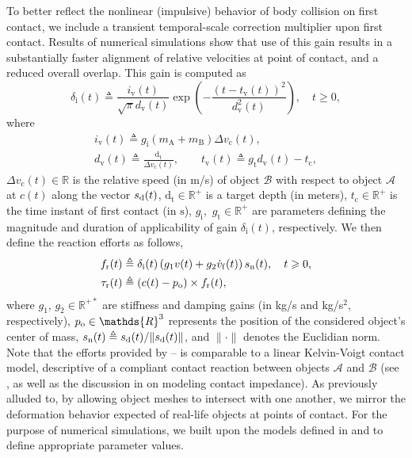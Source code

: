 To better reflect the nonlinear (impulsive) behavior of body collision on first contact, we include a transient temporal-scale correction multiplier upon first contact. Results of numerical simulations show that use of this gain results in a substantially faster alignment of relative velocities at point of contact, and a reduced overall overlap. This gain is computed as
%
\begin{equation}
	\delta_{\textrm{i}} (t) \triangleq \frac{i_\textrm{v}(t)}{\sqrt{\pi}d_\textrm{v}(t)} \exp \left(-\frac{(t-t_\textrm{v}(t))^2}{d_\textrm{v}^2(t)}\right),\quad
t \geqslant 0,
\end{equation}
%
\noindent where
%
\begin{gather}
	i_\textrm{v}(t) \triangleq g_\textrm{i} (m_\textrm{A} + m_\textrm{B}) \Delta v_\textrm{c}(t), \nonumber\\
	d_\textrm{v}(t) \triangleq \frac{\textrm{d}_\textrm{t}}{\Delta v_\textrm{c}(t)}, \qquad t_\textrm{v}(t) \triangleq g_\textrm{t} d_\textrm{v}(t) - t_\textrm{c}, \nonumber
\end{gather}
%
\noindent $\Delta v_\textrm{c}(t) \in \mathds{R}$ is the relative speed (in m/s) of object $\mathcal{B}$ with respect to object $\mathcal{A}$ at $c(t)$ along the vector $s_{\rm d}(t)$, $\textrm{d}_\textrm{t} \in \mathds{R}^+$ is a target depth (in meters), $t_\textrm{c} \in \mathds{R}^+$ is the time instant of first contact (in $\textrm{s}$), $g_\textrm{i},$ $g_\textrm{t} \in \mathds{R}^+$ are parameters defining the magnitude and duration of applicability of gain $\delta_{\textrm{i}}(t)$, respectively. We then define the reaction efforts as follows,
%
\begin{align}
f_{\rm r}(t) &\triangleq \delta_{\textrm{i}} (t) \left( g_1 v(t) + g_2 \dot v_{\rm f}(t) \right) s_{\rm n}(t),\quad t \geqslant 0,\label{eq:fr}\\
 \tau_{\rm r}(t) &\triangleq (c(t)-p_{\rm o}) \times f_{\rm r}(t), \label{eq:tr}
\end{align}
%
where $g_1$, $g_2 \in \mathds R^{+*}$ are stiffness and damping gains (in kg/s and kg/s$^2$, respectively), $p_{\rm o}\in \mathds{R}^3$ represents the position of the considered object's center of mass, $s_{\rm n}(t)\triangleq s_{\rm d}(t)/\|s_{\rm d}(t)\|$, and $\|\cdot \|$ denotes the Euclidian norm. Note that the efforts provided by -- is comparable to a linear Kelvin-Voigt contact model, descriptive of a compliant contact reaction between objects $\mathcal A$ and $\mathcal B$ (see \cite{diolaiti2005}, as well as the discussion in \cite{jain2011controlling} on modeling contact impedance). As previously alluded to, by allowing object meshes to intersect with one another, we mirror the deformation behavior expected of real-life objects at points of contact. For the purpose of numerical simulations, we built upon the models defined in \cite{diolaiti2005} and \cite{erickson2003contact} to define appropriate parameter values.
